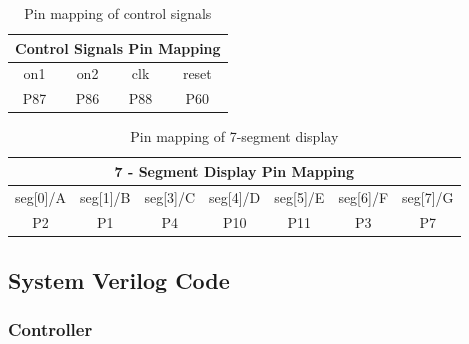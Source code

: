 \documentclass[11pt]{article}
\begin{document}
\begin{table}[h!]
\centering
\begin{tabular}{|c|c|c|c|}
\hline
\multicolumn{4}{|c|}{\textbf{Control Signals Pin Mapping}} \\ \hline
on1        & on2        & clk        & reset       \\ \hline
P87        & P86        & P88        & P60         \\ \hline
\end{tabular}
\caption{Pin mapping of control signals}
\label{table:pinmap_control}
\end{table}

\begin{table}[h!]
\centering
\begin{tabular}{|c|c|c|c|c|c|c|}
\hline
\multicolumn{7}{|c|}{\textbf{7 - Segment Display Pin Mapping}} \\ \hline
seg[0]/A   & seg[1]/B   & seg[3]/C   & seg[4]/D    & seg[5]/E    & seg[6]/F   & seg[7]/G   \\ \hline
P2         & P1         & P4         & P10         & P11         & P3         & P7  \\ \hline
\end{tabular}
\caption{Pin mapping of 7-segment display}
\label{table:pinmap_sevenseg}
\end{table}



\clearpage
\subsection{System Verilog Code}

\subsubsection{Controller}
\end{document}
